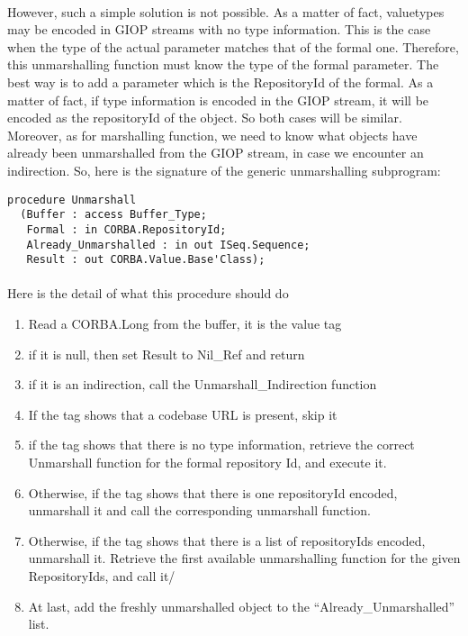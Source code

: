 \paragraph{}However, such a simple solution is not possible. As a matter of fact,
valuetypes may be encoded in GIOP streams with no type
information. This is the case when the type of the actual parameter
matches that of the formal one. Therefore, this unmarshalling function
must know the type of the formal parameter. The best way is to add a
parameter which is the RepositoryId of the formal. As a matter of
fact, if type information is encoded in the GIOP stream, it will be
encoded as the repositoryId of the object. So both cases will be
similar. Moreover, as for marshalling function, we need to know what
objects have already been unmarshalled from the GIOP stream, in case
we encounter an indirection. So, here is the signature of the generic
unmarshalling subprogram:


\begin{verbatim}
procedure Unmarshall
  (Buffer : access Buffer_Type;
   Formal : in CORBA.RepositoryId;
   Already_Unmarshalled : in out ISeq.Sequence;
   Result : out CORBA.Value.Base'Class);
\end{verbatim}

\paragraph{}Here is the detail of what this procedure should do
\begin{enumerate}
\item Read a CORBA.Long from the buffer, it is the value tag
\item if it is null, then set Result to Nil\_Ref and return
\item if it is an indirection, call the Unmarshall\_Indirection
  function
\item If the tag shows that a codebase URL is present, skip it
\item if the tag shows that there is no type information, retrieve the
correct Unmarshall function for the formal repository Id, and execute
it.
\item Otherwise, if the tag shows that there is one repositoryId
encoded, unmarshall it and call the corresponding unmarshall function.
\item Otherwise, if the tag shows that there is a list of
repositoryIds encoded, unmarshall it. Retrieve the first available
unmarshalling function for the given RepositoryIds, and call it/
\item At last, add the freshly unmarshalled object to the
``Already\_Unmarshalled'' list.
\end {enumerate}

